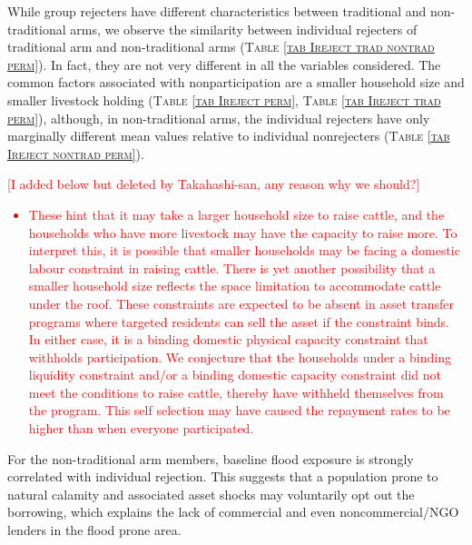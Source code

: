 	While group rejecters have different characteristics between \textsf{traditional} and non-\textsf{traditional} arms, we observe the similarity between individual rejecters of \textsf{traditional} arm and non-\textsf{traditional} arms (\textsc{\normalsize Table \ref{tab Ireject trad nontrad perm}}). In fact, they are not very different in all the variables considered. %
	The common factors associated with nonparticipation are a smaller household size and smaller livestock holding (\textsc{\normalsize Table \ref{tab Ireject perm}}, \textsc{\normalsize Table \ref{tab Ireject trad perm}}), although, in non-\textsf{traditional} arms, the individual rejecters have only marginally different mean values relative to individual nonrejecters (\textsc{\normalsize Table \ref{tab Ireject nontrad perm}}). 
	
	\textcolor{red}{[I added below but deleted by Takahashi-san, any reason why we should?]
	\begin{itemize}
	\vspace{1.0ex}\setlength{\itemsep}{1.0ex}\setlength{\baselineskip}{12pt}
	\item	These hint that it may take a larger household size to raise cattle, and the households who have more livestock may have the capacity to raise more. To interpret this, it is possible that smaller households may be facing a domestic labour constraint in raising cattle. There is yet another possibility that a smaller household size reflects the space limitation to accommodate cattle under the roof. These constraints are expected to be absent in asset transfer programs where targeted residents can sell the asset if the constraint binds. In either case, it is a binding domestic physical capacity constraint that withholds participation.	 We conjecture that the households under a binding liquidity constraint and/or a binding domestic capacity constraint did not meet the conditions to raise cattle, thereby have withheld themselves from the program. This self selection may have caused the repayment rates to be higher than when everyone participated. 
	\end{itemize}
	}
	For the non-\textsf{traditional} arm members, baseline flood exposure is strongly correlated with individual rejection. This suggests that a population prone to natural calamity and associated asset shocks may voluntarily opt out the borrowing, which explains the lack of commercial and even noncommercial/NGO lenders in the flood prone area. 

